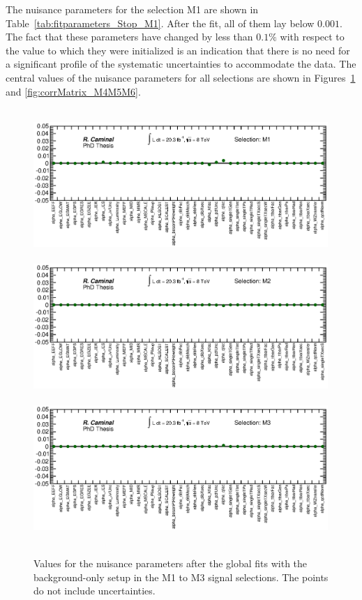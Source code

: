 The nuisance parameters for the selection M1 are shown in Table~\ref{tab:fitparameters_Stop_M1}.
After the fit, all of them lay below $0.001$.
The fact that these parameters have changed by less than $0.1\%$ with respect to the value to which they were initialized is an indication that there is no need for a significant profile of the systematic uncertainties to accommodate the data.
The central values of the nuisance parameters for all selections are shown in Figures~\ref{fig:corrMatrix_M1M2M3} and \ref{fig:corrMatrix_M4M5M6}.



\begin{figure}[!ht]
  \begin{center}
    \mbox{
      \includegraphics[width=0.995\textwidth]{MonojetAnalysis/Figures/NuisanceParamsZoomPlot_Stop_M1.eps}
    }
    \mbox{
      \includegraphics[width=0.995\textwidth]{MonojetAnalysis/Figures/NuisanceParamsZoomPlot_Stop_M2.eps}
    }
    \mbox{
      \includegraphics[width=0.995\textwidth]{MonojetAnalysis/Figures/NuisanceParamsZoomPlot_Stop_M3.eps}
    }
  \end{center}
  \caption[Nuisance parameter values after the global fits with the background-only setup in the M1 to M3 signal selections.]{Values for the nuisance parameters after the global fits with the background-only setup in the M1 to M3 signal selections. The points do not include uncertainties.}
  \label{fig:corrMatrix_M1M2M3}
\end{figure}


